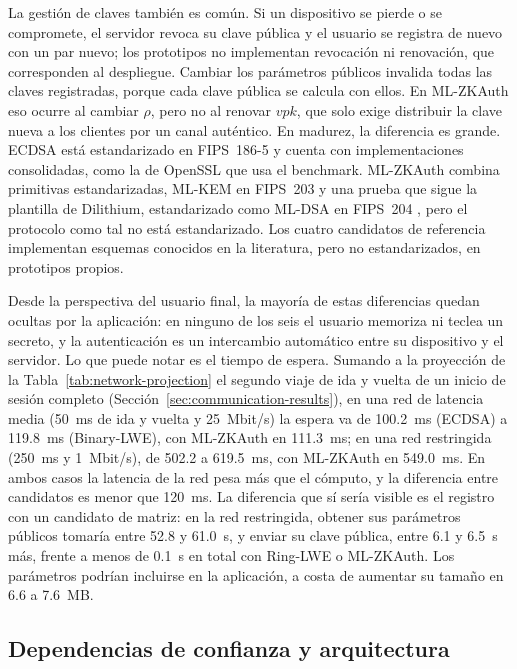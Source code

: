 La gestión de claves también es común. Si un dispositivo se pierde o se compromete, el servidor revoca su clave pública y el usuario se registra de nuevo con un par nuevo; los prototipos no implementan revocación ni renovación, que corresponden al despliegue. Cambiar los parámetros públicos invalida todas las claves registradas, porque cada clave pública se calcula con ellos. En ML-ZKAuth eso ocurre al cambiar $\rho$, pero no al renovar $vpk$, que solo exige distribuir la clave nueva a los clientes por un canal auténtico. En madurez, la diferencia es grande. ECDSA está estandarizado en FIPS~186-5 \cite{nist2023fips186} y cuenta con implementaciones consolidadas, como la de OpenSSL que usa el benchmark. ML-ZKAuth combina primitivas estandarizadas, ML-KEM en FIPS~203 \cite{nist2024fips203} y una prueba que sigue la plantilla de Dilithium, estandarizado como ML-DSA en FIPS~204 \cite{nist2024fips204}, pero el protocolo como tal no está estandarizado. Los cuatro candidatos de referencia implementan esquemas conocidos en la literatura, pero no estandarizados, en prototipos propios.

Desde la perspectiva del usuario final, la mayoría de estas diferencias quedan ocultas por la aplicación: en ninguno de los seis el usuario memoriza ni teclea un secreto, y la autenticación es un intercambio automático entre su dispositivo y el servidor. Lo que puede notar es el tiempo de espera. Sumando a la proyección de la Tabla~\ref{tab:network-projection} el segundo viaje de ida y vuelta de un inicio de sesión completo (Sección~\ref{sec:communication-results}), en una red de latencia media (50~ms de ida y vuelta y 25~Mbit/s) la espera va de 100.2~ms (ECDSA) a 119.8~ms (Binary-LWE), con ML-ZKAuth en 111.3~ms; en una red restringida (250~ms y 1~Mbit/s), de 502.2 a 619.5~ms, con ML-ZKAuth en 549.0~ms. En ambos casos la latencia de la red pesa más que el cómputo, y la diferencia entre candidatos es menor que 120~ms. La diferencia que sí sería visible es el registro con un candidato de matriz: en la red restringida, obtener sus parámetros públicos tomaría entre 52.8 y 61.0~s, y enviar su clave pública, entre 6.1 y 6.5~s más, frente a menos de 0.1~s en total con Ring-LWE o ML-ZKAuth. Los parámetros podrían incluirse en la aplicación, a costa de aumentar su tamaño en 6.6 a 7.6~MB.


\subsection{Dependencias de confianza y arquitectura}
\label{sec:trust-model}

